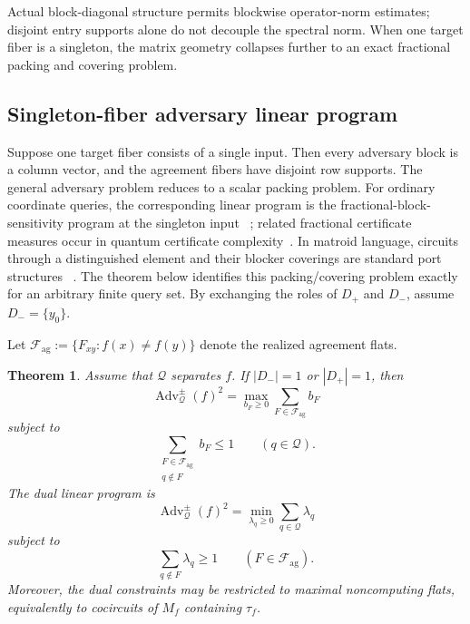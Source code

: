 \documentclass[11pt]{article}
\numberwithin{equation}{section}
\newtheorem{theorem}[definition]{Theorem}
\theoremstyle{remark}
\begin{document}
Actual block-diagonal structure permits blockwise operator-norm estimates; disjoint entry supports alone do not decouple the spectral norm. When one target fiber is a singleton, the matrix geometry collapses further to an exact fractional packing and covering problem.

\subsection{Singleton-fiber adversary linear program}
\label{subsec:singleton-fiber-scalarization}

Suppose one target fiber consists of a single input. Then every adversary
block is a column vector, and the agreement fibers have disjoint row supports.
The general adversary problem reduces to a scalar packing problem.
For ordinary coordinate queries, the corresponding linear program is the
fractional-block-sensitivity program at the singleton input
~\cite{KulkarniTal2016}; related fractional certificate measures occur in
quantum certificate complexity~\cite{AaronsonQuantumCertificate}. In matroid
language, circuits through a distinguished element and their blocker
coverings are standard port structures
~\cite{Seymour1977Ports,ChenDingZang2008}. The theorem below identifies this
packing/covering problem exactly for an arbitrary finite query set. By
exchanging the roles of $D_+$ and $D_-$, assume $D_-=\{y_0\}$.

Let \(\mathcal F_{\mathrm{ag}}:=\{F_{xy}:f(x)\neq f(y)\}\) denote the realized agreement flats.

\begin{theorem}
\label{thm:singleton-fiber-scalarization}
Assume that $\mathcal Q$ separates $f$.  If $|D_-|=1$ or $|D_+|=1$, then
\begin{equation}
    \operatorname{Adv}^{\pm}_{\mathcal Q}(f)^2
    =
    \max_{b_F\geq0}
        \sum_{F\in\mathcal F_{\mathrm{ag}}}b_F
\end{equation}
subject to
\begin{equation}
    \sum_{\substack{F\in\mathcal F_{\mathrm{ag}}\\q\notin F}}b_F
    \leq1
    \qquad(q\in\mathcal Q).
\end{equation}
The dual linear program is
\begin{equation}
    \operatorname{Adv}^{\pm}_{\mathcal Q}(f)^2
    =
    \min_{\lambda_q\geq0}
        \sum_{q\in\mathcal Q}\lambda_q
\end{equation}
subject to
\begin{equation}
    \sum_{q\notin F}\lambda_q\geq1
    \qquad(F\in\mathcal F_{\mathrm{ag}}).
\end{equation}
Moreover, the dual constraints may be restricted to maximal noncomputing
flats, equivalently to cocircuits of \(M_f\) containing \(\tau_f\).
\end{theorem}
\end{document}
